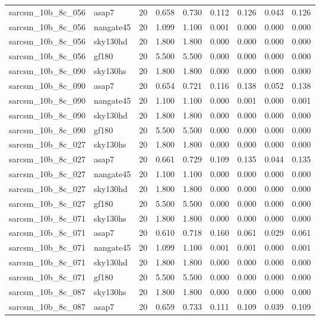 \begin{tabular}{llrrrrrrr}
sarcsm\_10b\_8c\_056 & asap7 & 20 & 0.658 & 0.730 & 0.112 & 0.126 & 0.043 & 0.126 \\
sarcsm\_10b\_8c\_056 & nangate45 & 20 & 1.099 & 1.100 & 0.001 & 0.000 & 0.000 & 0.000 \\
sarcsm\_10b\_8c\_056 & sky130hd & 20 & 1.800 & 1.800 & 0.000 & 0.000 & 0.000 & 0.000 \\
sarcsm\_10b\_8c\_056 & gf180 & 20 & 5.500 & 5.500 & 0.000 & 0.000 & 0.000 & 0.000 \\
sarcsm\_10b\_8c\_090 & sky130hs & 20 & 1.800 & 1.800 & 0.000 & 0.000 & 0.000 & 0.000 \\
sarcsm\_10b\_8c\_090 & asap7 & 20 & 0.654 & 0.721 & 0.116 & 0.138 & 0.052 & 0.138 \\
sarcsm\_10b\_8c\_090 & nangate45 & 20 & 1.100 & 1.100 & 0.000 & 0.001 & 0.000 & 0.001 \\
sarcsm\_10b\_8c\_090 & sky130hd & 20 & 1.800 & 1.800 & 0.000 & 0.000 & 0.000 & 0.000 \\
sarcsm\_10b\_8c\_090 & gf180 & 20 & 5.500 & 5.500 & 0.000 & 0.000 & 0.000 & 0.000 \\
sarcsm\_10b\_8c\_027 & sky130hs & 20 & 1.800 & 1.800 & 0.000 & 0.000 & 0.000 & 0.000 \\
sarcsm\_10b\_8c\_027 & asap7 & 20 & 0.661 & 0.729 & 0.109 & 0.135 & 0.044 & 0.135 \\
sarcsm\_10b\_8c\_027 & nangate45 & 20 & 1.100 & 1.100 & 0.000 & 0.000 & 0.000 & 0.000 \\
sarcsm\_10b\_8c\_027 & sky130hd & 20 & 1.800 & 1.800 & 0.000 & 0.000 & 0.000 & 0.000 \\
sarcsm\_10b\_8c\_027 & gf180 & 20 & 5.500 & 5.500 & 0.000 & 0.000 & 0.000 & 0.000 \\
sarcsm\_10b\_8c\_071 & sky130hs & 20 & 1.800 & 1.800 & 0.000 & 0.000 & 0.000 & 0.000 \\
sarcsm\_10b\_8c\_071 & asap7 & 20 & 0.610 & 0.718 & 0.160 & 0.061 & 0.029 & 0.061 \\
sarcsm\_10b\_8c\_071 & nangate45 & 20 & 1.099 & 1.100 & 0.001 & 0.001 & 0.000 & 0.001 \\
sarcsm\_10b\_8c\_071 & sky130hd & 20 & 1.800 & 1.800 & 0.000 & 0.000 & 0.000 & 0.000 \\
sarcsm\_10b\_8c\_071 & gf180 & 20 & 5.500 & 5.500 & 0.000 & 0.000 & 0.000 & 0.000 \\
sarcsm\_10b\_8c\_087 & sky130hs & 20 & 1.800 & 1.800 & 0.000 & 0.000 & 0.000 & 0.000 \\
sarcsm\_10b\_8c\_087 & asap7 & 20 & 0.659 & 0.733 & 0.111 & 0.109 & 0.039 & 0.109 \\

\end{tabular}
